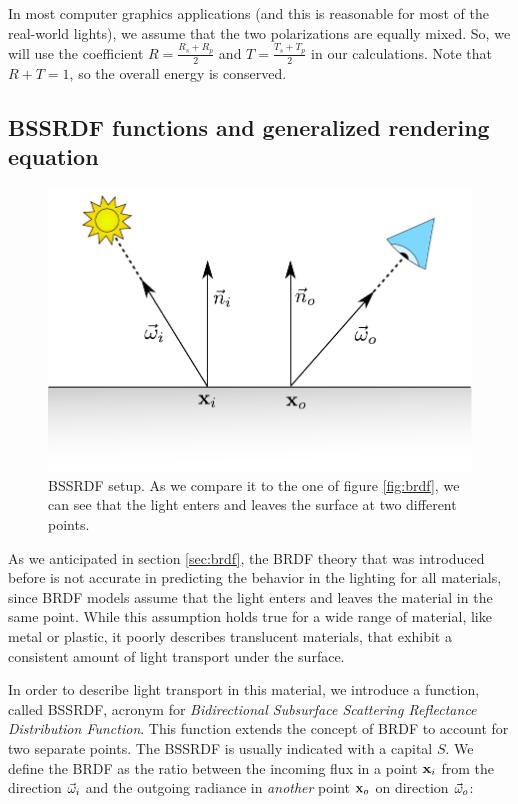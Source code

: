 In most computer graphics applications (and this is reasonable for most of the real-world lights), we assume that the two polarizations are equally mixed. So, we will use the coefficient $R = \frac{R_s + R_p}{2}$ and $T = \frac{T_s + T_p}{2}$ in our calculations. Note that $R + T = 1$, so the overall energy is conserved.

\subsection{BSSRDF functions and generalized rendering equation}
\begin{figure}
\centering
\includegraphics[width=0.8 \linewidth]{images/bssrdf} 
\caption{BSSRDF setup. As we compare it to the one of figure \ref{fig:brdf}, we can see that the light enters and leaves the surface at two different points.}
\label{fig:bssrdf}
\end{figure}

As we anticipated in section \ref{sec:brdf}, the BRDF theory that was introduced before is not accurate in predicting the behavior in the lighting for all materials, since BRDF models assume that the light enters and leaves the material in the same point. While this assumption holds true for a wide range of material, like metal or plastic, it poorly describes translucent materials, that exhibit a consistent amount of light transport under the surface. 

In order to describe light transport in this material, we introduce a function, called BSSRDF, acronym for \emph{Bidirectional Subsurface Scattering Reflectance Distribution Function}. This function extends the concept of BRDF to account for two separate points. The BSSRDF is usually indicated with a capital $S$. We define the BRDF as the ratio between the incoming flux in a point $\mathbf{x}_i$ from the direction $\vec{\omega}_i$ and the outgoing radiance in \emph{another} point $\mathbf{x}_o$ on direction $\vec{\omega}_o$:

